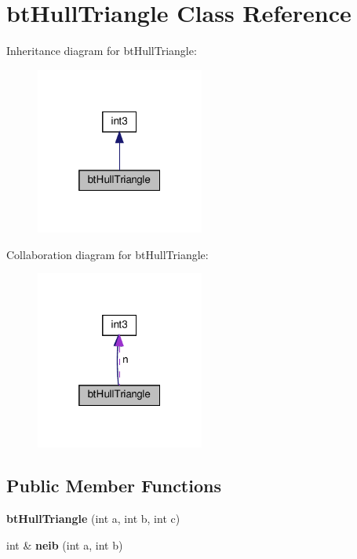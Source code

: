 \hypertarget{classbtHullTriangle}{}\section{bt\+Hull\+Triangle Class Reference}
\label{classbtHullTriangle}


Inheritance diagram for bt\+Hull\+Triangle\+:
\nopagebreak
\begin{figure}[H]
\begin{center}
\leavevmode
\includegraphics[width=157pt]{classbtHullTriangle__inherit__graph}
\end{center}
\end{figure}


Collaboration diagram for bt\+Hull\+Triangle\+:
\nopagebreak
\begin{figure}[H]
\begin{center}
\leavevmode
\includegraphics[width=157pt]{classbtHullTriangle__coll__graph}
\end{center}
\end{figure}
\subsection*{Public Member Functions}
\begin{DoxyCompactItemize}
\item 
\mbox{\label{classbtHullTriangle_ad7fd692541a77a50e5a549b51018cf32}} 
{\bfseries bt\+Hull\+Triangle} (int a, int b, int c)
\item 
\mbox{\label{classbtHullTriangle_a85baf5520041d90f16f6972c57b8391c}} 
int \& {\bfseries neib} (int a, int b)
\end{DoxyCompactItemize}
